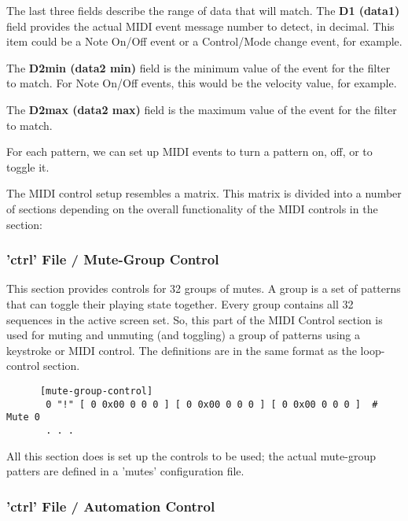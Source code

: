    The last three fields describe the range of data that will match.  The
   \textbf{D1 (data1)} field provides the actual MIDI event message number to
   detect, in decimal.  This item could be a Note On/Off event or a
   Control/Mode change event, for example.

   The \textbf{D2min (data2 min)} field is the minimum value of the event for
   the filter to match. For Note On/Off events, this would be the velocity
   value, for example.

   The \textbf{D2max (data2 max)} field is the maximum value of the event for
   the filter to match.


   For each pattern, we can set up MIDI events to turn a 
   pattern on, off, or to toggle it.

   The MIDI control setup resembles a matrix.  This matrix is divided into a
   number of sections depending on the overall functionality of the MIDI
   controls in the section:

\subsubsection{'ctrl' File / Mute-Group Control}
\label{subsubsec:configuration_ctrl_mute_group_control}

   This section provides controls for 32 groups of mutes.
   A group is a set of patterns that can toggle their playing state
   together.  Every group contains all 32 sequences in the active screen set.
   So, this part of the MIDI Control section is used for muting and unmuting
   (and toggling) a group of patterns using a keystroke or MIDI control.
   The definitions are in the same format as the loop-control section.

   \begin{verbatim}
      [mute-group-control]
       0 "!" [ 0 0x00 0 0 0 ] [ 0 0x00 0 0 0 ] [ 0 0x00 0 0 0 ]  # Mute 0
       . . .
   \end{verbatim}

   All this section does is set up the controls to be used; the actual
   mute-group patters are defined in a 'mutes' configuration file.

\subsubsection{'ctrl' File / Automation Control}
\label{subsubsec:configuration_midi_ctrl_automation}

